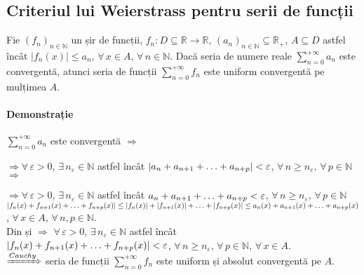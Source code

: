 \subsection{Criteriul lui Weierstrass pentru serii de funcții}
Fie $(f_{n})_{n \in \mathbb{N}}$ un șir de funcții, $f_{n}:D \subseteq
\mathbb{R} \rightarrow \mathbb{R}$, $(a_{n})_{n \in \mathbb{N}} \subseteq
\mathbb{R}_{+}$, $A \subseteq D$ astfel încât $\lvert f_{n}(x) \rvert \leq
a_{n}$, $\forall \, x \in A$, $\forall \, n \in \mathbb{N}$. Dacă seria de
numere reale $\displaystyle\sum_{n = 0}^{+\infty}a_{n}$ este convergentă,
atunci seria de funcții $\displaystyle\sum_{n = 0}^{+\infty}f_{n}$ este
uniform convergentă pe mulțimea $A$.

\paragraph{Demonstrație}
$\displaystyle\sum_{n = 0}^{+\infty}a_{n}$ este convergentă $\Rightarrow$ 

$\Rightarrow$$\forall \, \varepsilon > 0$, $\exists \, n_{\varepsilon} \in
\mathbb{N}$ astfel încât $\lvert a_{n} + a_{n+1} + \mathellipsis + a_{n+p}
\rvert < \varepsilon$, $\forall \, n \geq n_{\varepsilon}$, $\forall \, p
\in \mathbb{N}$ $\Rightarrow$

$\Rightarrow$$\forall \, \varepsilon > 0$, $\exists \, n_{\varepsilon} \in
\mathbb{N}$ astfel încât $a_{n} + a_{n+1} + \mathellipsis + a_{n+p} <
\varepsilon$, $\forall \, n \geq n_{\varepsilon}$, $\forall \, p \in
\mathbb{N}$  \\[5pt]

$\lvert f_{n}(x)+f_{n+1}(x)+\mathellipsis+f_{n+p}(x) \rvert \leq \lvert
f_{n}(x) \rvert + \lvert f_{n+1}(x) \rvert + \mathellipsis + \lvert
f_{n+p}(x) \rvert \leq a_{n}(x)+a_{n+1}(x)+\mathellipsis+a_{n+p}(x)$,
$\forall \, x \in A$, $\forall \, n,p \in \mathbb{N}$.  \\[15pt]

Din  și  $\Rightarrow$ $\forall \, \varepsilon > 0$,
$\exists \, n_{\varepsilon} \in \mathbb{N}$ astfel încât \\

$\lvert f_{n}(x)+f_{n+1}(x)+\mathellipsis+f_{n+p}(x) \rvert < \varepsilon$,
$\forall \, n \geq n_{\varepsilon}$, $\forall \, p \in \mathbb{N}$, $\forall
\, x \in A$. \\

$\xRightarrow{Cauchy}$ seria de funcții
$\displaystyle\sum_{n=0}^{+\infty}f_{n}$ este uniform și absolut convergentă
pe $A$.
